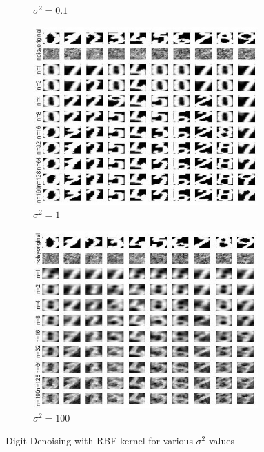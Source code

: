 \begin{figure}[!htpb]
\begin{subfigure}[b]{0.25\textwidth}
		\caption{$\sigma^2 = 0.1$}\label{fig:dig_denoise_rbf_sig_1}
	\end{subfigure}%
	\begin{subfigure}[b]{0.25\textwidth}
		\centering
		\includegraphics[height= 0.75\textwidth, width = 0.95\textwidth]{Exercise3/Report/dig_denoise_rbf_sig_10}
		\caption{$\sigma^2 = 1$}\label{fig:dig_denoise_rbf_sig_10}
	\end{subfigure}%
	\begin{subfigure}[b]{0.25\textwidth}
		\centering
		\includegraphics[height= 0.75\textwidth, width = 0.95\textwidth]{Exercise3/Report/dig_denoise_rbf_sig_100}
		\caption{$\sigma^2 = 100$}\label{fig:dig_denoise_rbf_sig_100}
	\end{subfigure}%
	\caption{Digit Denoising with RBF kernel for various $\sigma^2$ values}
	\label{fig:dig_denoise_rbf_sig}
\end{figure}

